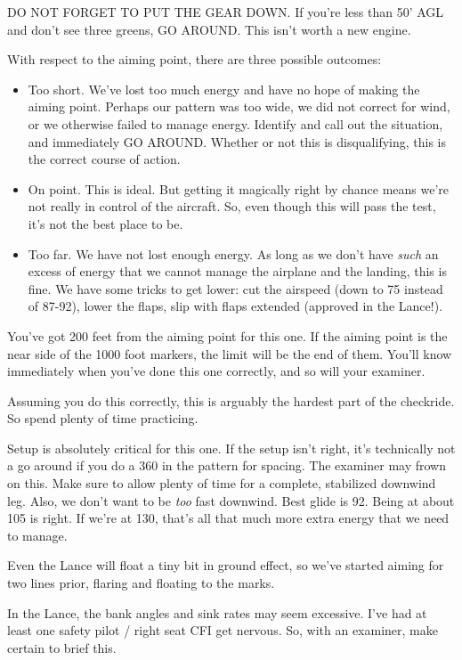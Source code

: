 DO NOT FORGET TO PUT THE GEAR DOWN. If you're less than 50' AGL and don't see three greens, GO AROUND. This isn't worth a new engine.

With respect to the aiming point, there are three possible outcomes:

\begin{itemize}
\item{Too short.} We've lost too much energy and have no hope of making the aiming point. Perhaps our pattern was too wide, we did not correct for wind, or we otherwise failed to manage energy. Identify and call out the situation, and immediately GO AROUND. Whether or not this is disqualifying, this is the correct course of action.
\item{On point.} This is ideal. But getting it magically right by chance means we're not really in control of the aircraft. So, even though this will pass the test, it's not the best place to be.
\item{Too far.} We have not lost enough energy. As long as we don't have \emph{such} an excess of energy that we cannot manage the airplane and the landing, this is fine. We have some tricks to get lower: cut the airspeed (down to 75 instead of 87-92), lower the flaps, slip with flaps extended (approved in the Lance!).
\end{itemize}

You've got 200 feet from the aiming point for this one. If the aiming point is the near side of the 1000 foot markers, the limit will be the end of them. You'll know immediately when you've done this one correctly, and so will your examiner.

Assuming you do this correctly, this is arguably the hardest part of the checkride. So spend plenty of time practicing.

Setup is absolutely critical for this one. If the setup isn't right, it's technically not a go around if you do a 360 in the pattern for spacing. The examiner may frown on this. Make sure to allow plenty of time for a complete, stabilized downwind leg. Also, we don't want to be \emph{too} fast downwind. Best glide is 92. Being at about 105 is right. If we're at 130, that's all that much more extra energy that we need to manage.

Even the Lance will float a tiny bit in ground effect, so we've started aiming for two lines prior, flaring and floating to the marks.

In the Lance, the bank angles and sink rates may seem excessive. I've had at least one safety pilot / right seat CFI get nervous. So, with an examiner, make certain to brief this.

